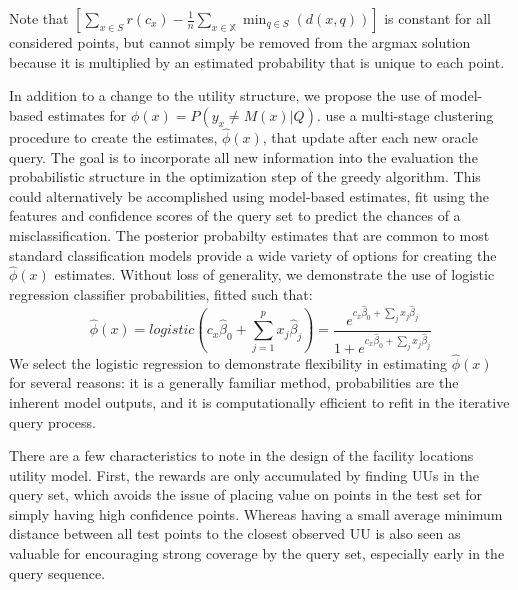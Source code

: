 \documentclass[letterpaper]{article} %
\begin{document}
Note that $\left[\sum_{x \in S} r \left(c_x\right) - \frac{1}{n} \sum_{x \in \mathbb{X}} \min_{q \in S}\left(d\left(x,q\right)\right)\right]$ is constant for all considered points, but cannot simply be removed from the argmax solution because it is multiplied by an estimated probability that is unique to each point. 

In addition to a change to the utility structure, we propose the use of model-based estimates for $\phi(x) = P\left(y_x \neq M(x) |Q \right)$. \citet{Bansal2018} use a multi-stage clustering procedure to create the estimates, $\hat{\phi}(x)$, that update after each new oracle query. The goal is to incorporate all new information into the evaluation the probabilistic structure in the optimization step of the greedy algorithm. This could alternatively be accomplished using model-based estimates, fit using the features and confidence scores of the query set to predict the chances of a misclassification. The posterior probabilty estimates that are common to most standard classification models provide a wide variety of options for creating the $\hat{\phi}(x)$ estimates. Without loss of generality, we demonstrate the use of logistic regression classifier probabilities, fitted such that:
$$\hat{\phi}(x) = logistic(c_x\hat{\beta}_0 + \sum_{j=1}^p x_j\hat{\beta}_j) = \frac{e^{c_x\hat{\beta}_0 + \sum_j x_j\hat{\beta}_j}}{1+e^{c_x\hat{\beta}_0 + \sum_j x_j\hat{\beta}_j}}$$
We select the logistic regression to demonstrate flexibility in estimating $\hat{\phi}(x)$ for several reasons: it is a generally familiar method, probabilities are the inherent model outputs, and it is computationally efficient to refit in the iterative query process. 

There are a few characteristics to note in the design of the facility locations utility model. First, the rewards are only accumulated by finding UUs in the query set, which avoids the issue of placing value on points in the test set for simply having high confidence points. Whereas having a small average minimum distance between all test points to the closest observed UU is also seen as valuable for encouraging strong coverage by the query set, especially early in the query sequence. 
\end{document}
